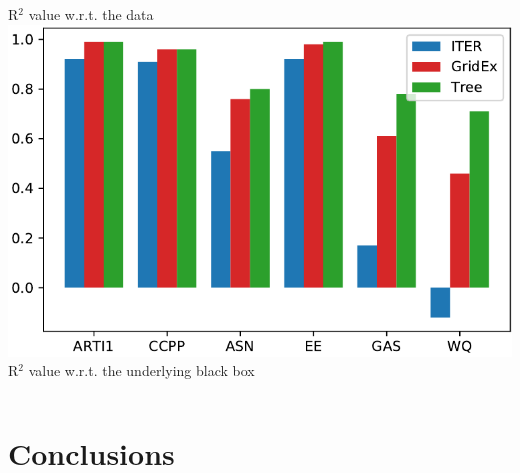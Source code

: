 \documentclass[presentation]{beamer}
\begin{document}
\begin{frame}
\begin{columns}[t]
		 	R$^2$ value w.r.t. the data\vspace{10px}
			\includegraphics[width=.8\columnwidth]{img/comp/r2fid.pdf}\\
			R$^2$ value w.r.t. the underlying black box
	\end{columns}

\end{frame}

\section{Conclusions}
\end{document}
